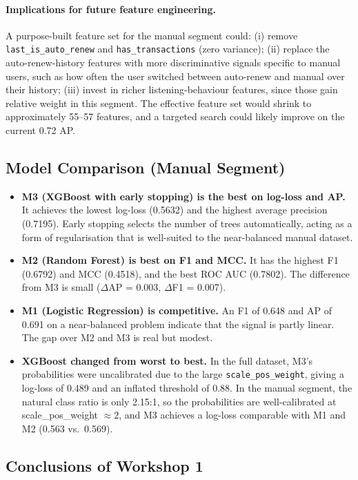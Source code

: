 \documentclass{article}
\begin{document}
\paragraph{Implications for future feature engineering.}
A purpose-built feature set for the manual segment could: (i) remove \texttt{last\_is\_auto\_renew} and \texttt{has\_transactions} (zero variance); (ii) replace the auto-renew-history features with more discriminative signals specific to manual users, such as how often the user switched between auto-renew and manual over their history; (iii) invest in richer listening-behaviour features, since those gain relative weight in this segment. The effective feature set would shrink to approximately 55--57 features, and a targeted search could likely improve on the current 0.72 AP.

\subsection{Model Comparison (Manual Segment)}

\begin{itemize}
    \item \textbf{M3 (XGBoost with early stopping) is the best on log-loss and AP.} It achieves the lowest log-loss (0.5632) and the highest average precision (0.7195). Early stopping selects the number of trees automatically, acting as a form of regularisation that is well-suited to the near-balanced manual dataset.
    \item \textbf{M2 (Random Forest) is best on F1 and MCC.} It has the highest F1 (0.6792) and MCC (0.4518), and the best ROC AUC (0.7802). The difference from M3 is small ($\Delta$AP = 0.003, $\Delta$F1 = 0.007).
    \item \textbf{M1 (Logistic Regression) is competitive.} An F1 of 0.648 and AP of 0.691 on a near-balanced problem indicate that the signal is partly linear. The gap over M2 and M3 is real but modest.
    \item \textbf{XGBoost changed from worst to best.} In the full dataset, M3's probabilities were uncalibrated due to the large \texttt{scale\_pos\_weight}, giving a log-loss of 0.489 and an inflated threshold of 0.88. In the manual segment, the natural class ratio is only 2.15:1, so the probabilities are well-calibrated at scale\_pos\_weight $\approx 2$, and M3 achieves a log-loss comparable with M1 and M2 (0.563 vs.\ 0.569).
\end{itemize}

\subsection{Conclusions of Workshop 1}
\end{document}
